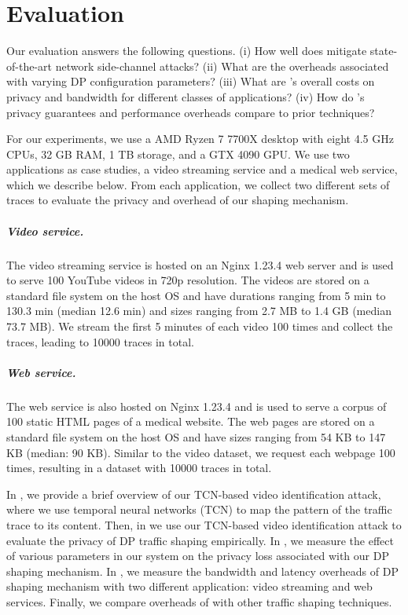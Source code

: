 \chapter{Evaluation}\label{ch:evaluation}
Our evaluation answers the following questions.
(i) How well does {\sys} mitigate state-of-the-art network side-channel attacks?
(ii) What are the overheads associated with varying DP configuration parameters?
(iii) What are {\sys}'s overall costs on privacy and bandwidth for different classes of applications?
(iv) How do {\sys}'s privacy guarantees and performance overheads compare to prior techniques?


For our experiments, we use a AMD Ryzen 7 7700X desktop with eight 4.5 GHz CPUs, 32 GB RAM, 1 TB storage, and a GTX 4090 GPU.
We use two applications as case studies, a video streaming service and a medical web service, which we describe below.
From each application, we collect two different sets of traces to evaluate the privacy and overhead of our shaping mechanism.
\paragraph{Video service.}
The video streaming service is hosted on an Nginx 1.23.4 web server and is used to serve 100 YouTube videos in 720p resolution.
The videos are stored on a standard file system on the host OS and have durations ranging from 5 min to 130.3 min (median 12.6 min) and sizes ranging from 2.7 MB to 1.4 GB (median 73.7 MB).
We stream the first 5 minutes of each video 100 times and collect the traces, leading to 10000 traces in total.

\paragraph{Web service.}
The web service is also hosted on Nginx 1.23.4 and is used to serve a corpus of 100 static HTML pages of a medical website.
The web pages are stored on a standard file system on the host OS and have sizes ranging from 54 KB to 147 KB (median: 90 KB).
Similar to the video dataset, we request each webpage 100 times, resulting in a dataset with 10000 traces in total.
%


In , we provide a brief overview of our TCN-based video identification attack, where we use temporal neural networks (TCN) to map the pattern of the traffic trace to its content.
Then, in  we use our TCN-based video identification attack to evaluate the privacy of DP traffic shaping empirically.
In , we measure the effect of various parameters in our system on the privacy loss associated with our DP shaping mechanism. 
In , we measure the bandwidth and latency overheads of DP shaping mechanism with two different application: video streaming and web services.
Finally, we compare overheads of {\sys} with other traffic shaping techniques.  


